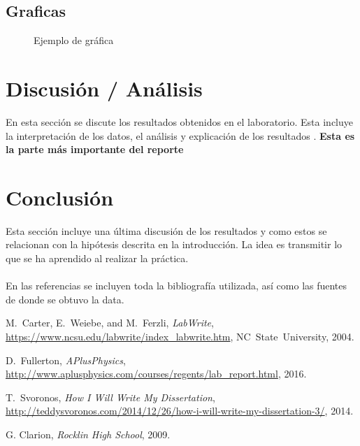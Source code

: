 \documentclass[article, 11pt]{IEEEtran}   %
\begin{document}
\subsection{Graficas}
\begin{figure}[H]
\centering
{}
\caption{Ejemplo de gr\'afica}\label{diagram1}   %
\end{figure}

\section{Discusi\'on / An\'alisis}
En esta secci\'on se discute los resultados obtenidos en el laboratorio. Esta incluye la interpretaci\'on de los datos, el an\'alisis y explicaci\'on de los resultados . \textbf{Esta es la parte m\'as importante del reporte}

\section{Conclusi\'on}
Esta secci\'on incluye una \'ultima discusi\'on de los resultados y como estos se relacionan con la hip\'otesis descrita en la introducci\'on.
La idea es transmitir lo que se ha aprendido al realizar la pr\'actica.\\ \\
En las referencias se incluyen toda la bibliograf\'ia utilizada, as\'i como las fuentes de donde se obtuvo la data.
\begin{thebibliography}{1}

M.~Carter, E.~Weiebe, and M.~Ferzli, \emph{LabWrite}, \url{https://www.ncsu.edu/labwrite/index_labwrite.htm}, NC~State~University, 2004.

D.~Fullerton, \emph{APlusPhysics}, \url{http://www.aplusphysics.com/courses/regents/lab_report.html}, 2016.

T.~Svoronos, \emph{How I Will Write My Dissertation}, \url{http://teddysvoronos.com/2014/12/26/how-i-will-write-my-dissertation-3/}, 2014.

G. Clarion, \emph{Rocklin High School}, 2009.

\end{thebibliography}
\end{document}
